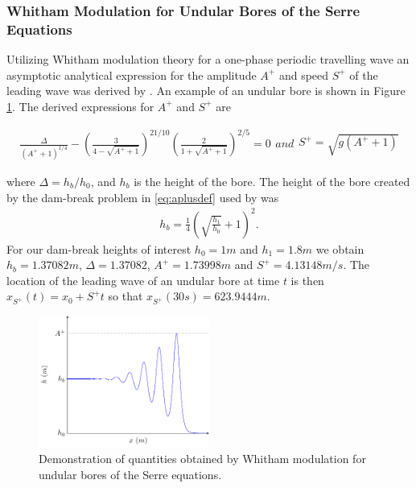 \documentclass[times]{elsarticle}
\begin{document}
\subsubsection{Whitham Modulation for Undular Bores of the Serre Equations}
Utilizing Whitham modulation theory for a one-phase periodic travelling wave an asymptotic analytical expression for the amplitude $A^+$ and speed $S^+$ of the leading wave was derived by \citet{El-etal-2006}. An example of an undular bore is shown in Figure \ref{fig:Serreanadiagram}.
The derived expressions for $A^+$ and $S^+$ are
\begin{linenomath*}
	\begin{subequations}
		\begin{gather}
		\frac{\Delta}{\left(A^+ + 1\right)^{1/4}} - \left(\frac{3}{4 -  \sqrt{A^+ + 1}}\right)^{21/10} \left(\frac{2}{1 + \sqrt{A^+ + 1}}\right)^{2/5} = 0
		\label{eq:aplusdef}
		\end{gather}
		and
		\begin{gather}
		S^+ = \sqrt{g \left(A^+ + 1\right)}
		\label{eq:splusdef}
		\end{gather}
		\label{eq:ELWhitMod}	
	\end{subequations}
\end{linenomath*}
where $\Delta = h_b / h_0$, and $h_b$ is the height of the bore. The height of the bore created by the dam-break problem in \eqref{eq:aplusdef} used by \citet{El-etal-2006} was
\begin{gather*}
\label{eqn:hrdef}
h_b = \frac{1}{4}\left(\sqrt{\frac{h_1}{h_0}} + 1\right)^2.
\end{gather*} 
For our dam-break heights of interest $h_0 = 1m$ and $h_1 = 1.8m$ we obtain $h_b = 1.37082m$, $\Delta = 1.37082$, $A^+ = 1.73998m$ and $S^+ = 4.13148m/s$. The location of the leading wave of an undular bore at time $t$ is then $x_{S^+}(t) = x_0 + S^+ t$ so that $x_{S^+}(30s) = 623.9444m$.


\begin{figure}
	\centering
	\includegraphics[width=0.5\textwidth]{Figure-3.pdf}
	\caption{Demonstration of quantities obtained by Whitham modulation for undular bores of the Serre equations.}
	\label{fig:Serreanadiagram}
\end{figure}
\end{document}
